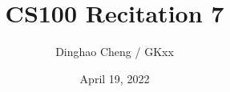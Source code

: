 \documentclass{beamer}
\title{CS100 Recitation 7}
\author{Dinghao Cheng / GKxx}
\date{April 19, 2022}
\begin{document}
\begin{frame}
    \maketitle
\end{frame}



\end{document}
